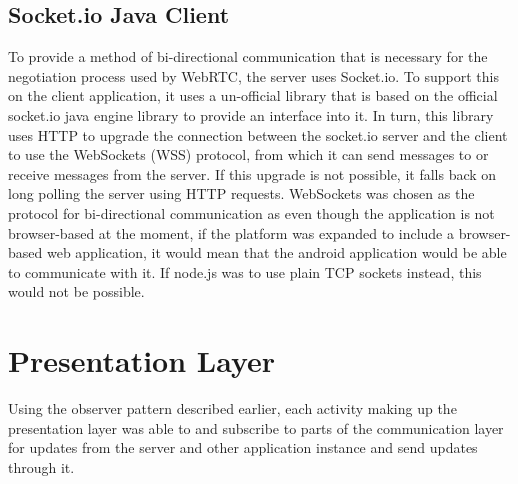 \documentclass[]{report}
\begin{document}
			
			\subsection{Socket.io Java Client}
			To provide a method of bi-directional communication that is necessary for the negotiation process used by WebRTC, the server uses Socket.io. To support this on the client application, it uses a un-official library that is based on the official socket.io java engine library to provide an interface into it. In turn, this library uses HTTP to upgrade the connection between the socket.io server and the client to use the WebSockets (WSS) protocol, from which it can send messages to or receive messages from the server. If this upgrade is not possible, it falls back on long polling the server using HTTP requests. WebSockets was chosen as the protocol for bi-directional communication as even though the application is not browser-based at the moment, if the platform was expanded to include a browser-based web application, it would mean that the android application would be able to communicate with it. If node.js was to use plain TCP sockets instead, this would not be possible.
		
		\section{Presentation Layer}
		Using the observer pattern described earlier, each activity making up the presentation layer was able to and subscribe to parts of the communication layer for updates from the server and other application instance and send updates through it. 
		
\end{document}
